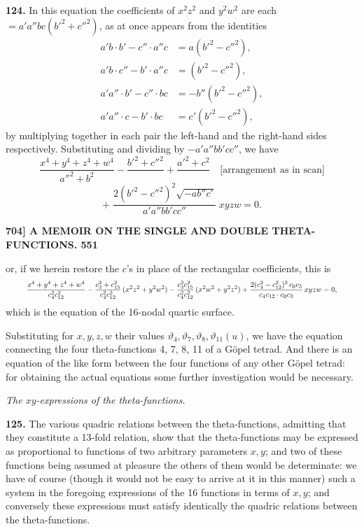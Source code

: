 \documentclass[11pt]{article}
\begin{document}
\medskip
\textbf{124.} In this equation the coefficients of $x^2z^2$ and $y^2w^2$ are each $= a'a''bc(b'^2 + c''^2)$, as at once appears from the identities
\[
\begin{aligned}
a'b\cdot b' - c''\cdot a''c &= a(b'^2 - c''^2),\\
a'b\cdot c'' - b'\cdot a''c &= (b'^2 - c''^2),\\
a'a''\cdot b' - c''\cdot bc &= -b''(b'^2 - c''^2),\\
a'a''\cdot c - b'\cdot bc &= c'(b'^2 - c''^2),
\end{aligned}
\]
by multiplying together in each pair the left-hand and the right-hand sides respectively. Substituting and dividing by $-a'a''bb'cc''$, we have
\[
\frac{x^4 + y^4 + z^4 + w^4}{a''^2 + b^2} - \frac{b'^2 + c''^2}{\ \ } + \frac{a'^2 + c^2}{\ \ }\quad\text{[arrangement as in scan]}
\]
\[
+\;\frac{2(b'^2 - c''^2)^2\sqrt{-ab''c'}}{a'a''bb'cc''}\;xyzw = 0.
\]

\newpage
\noindent\textbf{704] \quad A MEMOIR ON THE SINGLE AND DOUBLE THETA-FUNCTIONS. \hfill 551}

\medskip
or, if we herein restore the $c$'s in place of the rectangular coefficients, this is
\[
\resizebox{0.92\textwidth}{!}{$\displaystyle
\frac{x^4 + y^4 + z^4 + w^4}{c_4^2 c_{12}^2}
- \frac{c_3^2 + c_{15}^2}{c_4^2 c_{12}^2}\,(x^2z^2 + y^2w^2)
- \frac{c_3^2 c_{15}^2}{c_4^2 c_{12}^2}\,(x^2w^2 + y^2z^2)
+ \frac{2(c_4^2 - c_{12}^2)^2\,c_0 c_3}{c_4 c_{12}\cdot c_0 c_3}\,xyzw = 0,
$}
\]
which is the equation of the 16-nodal quartic surface.

\medskip
Substituting for $x, y, z, w$ their values $\vartheta_4, \vartheta_7, \vartheta_8, \vartheta_{11}(u)$, we have the equation connecting the four theta-functions 4, 7, 8, 11 of a G\"opel tetrad. And there is an equation of the like form between the four functions of any other G\"opel tetrad: for obtaining the actual equations some further investigation would be necessary.

\medskip
\begin{center}\textit{The $xy$-expressions of the theta-functions.}\end{center}

\medskip
\textbf{125.} The various quadric relations between the theta-functions, admitting that they constitute a 13-fold relation, show that the theta-functions may be expressed as proportional to functions of two arbitrary parameters $x, y$; and two of these functions being assumed at pleasure the others of them would be determinate: we have of course (though it would not be easy to arrive at it in this manner) such a system in the foregoing expressions of the 16 functions in terms of $x, y$; and conversely these expressions must satisfy identically the quadric relations between the theta-functions.
\end{document}
